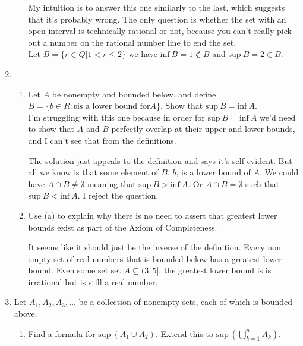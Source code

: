 \documentclass{article}
\numberwithin{equation}{subsection}
\theoremstyle{definition}
\begin{document}
\begin{enumerate}
\begin{enumerate}
                My intuition is to answer this one similarly to the last, which suggests
                that it's probably wrong. The only question is whether the set with an
                open interval is technically rational or not, because you can't really
                pick out a number on the rational number line to end the set. \\

                Let $B = \{r \in Q | 1 < r \leq 2\}$ we have $\text{inf}~B = 1 \notin B$
                and $\text{sup}~B = 2 \in B$.

        \end{enumerate}

    \item 
        \begin{enumerate}
            \item Let $A$ be nonempty and bounded below, and define $B = \{b \in R: b
                \text{is a lower bound for} A\}$. Show that $\text{sup}~B =
                \text{inf}~A$.\\

                I'm struggling with this one because in order for $\text{sup}~B =
                \text{inf}~A$ we'd need to show that $A$ and $B$ perfectly overlap at
                their upper and lower bounds, and I can't see that from the definitions.

                The solution just appeals to the definition and says it's self evident.
                But all we know is that some element of $B$, $b$, is a lower bound of $A$.
                We could have $A \cap B \neq \emptyset$ meaning that $\text{sup}~B >
                \text{inf}~A$. Or $A \cap B = \emptyset$ such that $\text{sup}~B <
                    \text{inf}~A$. I reject the question.

            \item Use (a) to explain why there is no need to assert that greatest lower
                bounds exist as part of the Axiom of Completeness.

                It seems like it should just be the inverse of the definition. Every non
                empty set of real numbers that is bounded below has a greatest lower
                bound. Even some set set $A \subseteq (3, 5]$, the greatest lower bound is
                is irrational but is still a real number.

        \end{enumerate}
            \item Let $A_1, A_2, A_3, \ldots$ be a collection of nonempty sets, each of
                which is bounded above.
        \begin{enumerate}
            \item Find a formula for $\text{sup}~(A_1 \cup A_2)$. Extend this to
                $\text{sup}~(\bigcup_{k=1}^n A_k)$.


\end{enumerate}
\end{enumerate}
\end{document}
